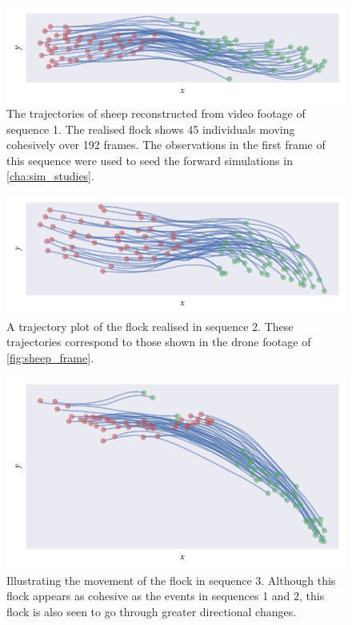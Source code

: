 \begin{figure}[tbp]
  \includegraphics{seq_1_traj.pdf}
  \caption{The trajectories of sheep reconstructed from video footage of
    sequence 1. The realised flock shows 45 individuals moving cohesively
    over 192 frames. The observations in the first frame of this sequence were
    used to seed the forward simulations in \cref{cha:sim_studies}.}
  \label{fig:seq_1_traj}
\end{figure}
\begin{figure}[tbp]
  \includegraphics{seq_2_traj.pdf}
  \caption{A trajectory plot of the flock realised in sequence 2. These
    trajectories correspond to those shown in the drone footage of
  \cref{fig:sheep_frame}.}
  \label{fig:seq_2_traj}
\end{figure}
\begin{figure}[tbp]
  \includegraphics{seq_3_traj.pdf}
  \caption{Illustrating the movement of the flock in sequence 3. Although
    this flock appears as cohesive as the events in sequences 1 and 2,
    this flock is also seen to go through greater directional changes.}
  \label{fig:seq_3_traj}
\end{figure}

